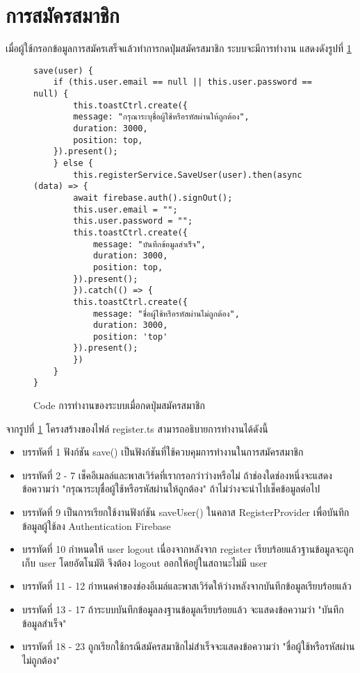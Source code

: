 \section{การสมัครสมาชิก}
เมื่อผู้ใช้กรอกข้อมูลการสมัครเสร็จแล้วทำการกดปุ่มสมัครสมาชิก ระบบจะมีการทำงาน แสดงดังรูปที่ \ref{Fig:4-Register}
\begin{figure}[H]
{\lstset{language=Pascal}
\begin{lstlisting}
save(user) {
	if (this.user.email == null || this.user.password == null) {
		this.toastCtrl.create({
		message: "กรุณาระบุชื่อผู้ใช้หรือรหัสผ่านให้ถูกต้อง",
		duration: 3000,
		position: top,
	}).present();
	} else {
		this.registerService.SaveUser(user).then(async (data) => {
		await firebase.auth().signOut();
		this.user.email = "";
		this.user.password = "";
		this.toastCtrl.create({
			message: "บันทึกข้อมูลสำเร็จ",
			duration: 3000,
			position: top,
		}).present();
		}).catch(() => {
		this.toastCtrl.create({
			message: "ชื่อผู้ใช้หรือรหัสผ่านไม่ถูกต้อง",
			duration: 3000,
			position: 'top'
		}).present();
		})
	}
}
\end{lstlisting}}
\caption{Code การทำงานของระบบเมื่อกดปุ่มสมัครสมาชิก}
\label{Fig:4-Register}
\end{figure}
\newpage
จากรูปที่ \ref{Fig:4-Register} โครงสร้างของไฟล์ register.ts สามารถอธิบายการทำงานได้ดังนี้
\begin{itemize}[label={--}]
\item บรรทัดที่ 1 ฟังก์ชัน save() เป็นฟังก์ชันที่ใช้ควบคุมการทำงานในการสมัครสมาชิก
\item บรรทัดที่ 2 - 7 เช็คอีเมลล์และพาสเวิร์ดที่เรากรอกว่าว่างหรือไม่ ถ้าช่องใดช่องหนึ่งจะแสดงข้อความว่า "กรุณาระบุชื่อผู้ใช้หรือรหัสผ่านให้ถูกต้อง" ถ้าไม่ว่างจะนำไปเช็คข้อมูลต่อไป
\item บรรทัดที่ 9 เป็นการเรียกใช้งานฟังก์ชัน saveUser() ในคลาส RegisterProvider เพื่อบันทึกข้อมูลผู้ใช้ลง Authentication Firebase 
\item บรรทัดที่ 10 กำหนดให้ user logout เนื่องจากหลังจาก register เรียบร้อยแล้วฐานข้อมูลจะถูกเก็บ user โดยอัตโนมัติ จึงต้อง logout ออกให้อยู่ในสถานะไม่มี user
\item บรรทัดที่ 11 - 12 กำหนดค่าของช่องอีเมล์และพาสเวิร์ดให้ว่างหลังจากบันทึกข้อมูลเรียบร้อยแล้ว
\item บรรทัดที่ 13 - 17 ถ้าระบบบันทึกข้อมูลลงฐานข้อมูลเรียบร้อยแล้ว จะแสดงข้อความว่า "บันทึกข้อมูลสำเร็จ"
\item บรรทัดที่ 18 - 23 ถูกเรียกใช้กรณีสมัครสมาชิกไม่สำเร็จจะแสดงข้อความว่า "ชื่อผู้ใช้หรือรหัสผ่านไม่ถูกต้อง"
\end{itemize}
\newpage

